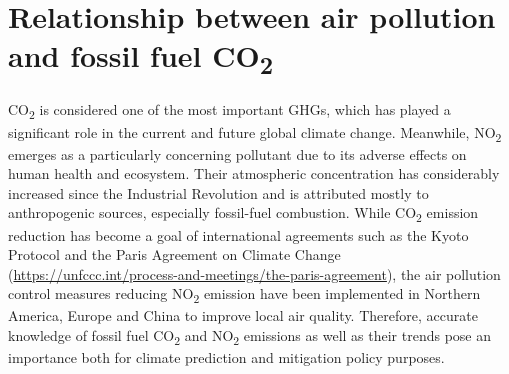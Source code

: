 \section{Relationship between air pollution and fossil fuel CO\textsubscript{2}}
CO\textsubscript{2} is considered one of the most important GHGs, which has played a significant role in the current and future global climate change. Meanwhile, NO\textsubscript{2} emerges as a particularly concerning pollutant due to its adverse effects on human health and ecosystem. Their atmospheric concentration has considerably increased since the Industrial Revolution and is attributed mostly to anthropogenic sources, especially fossil-fuel combustion. While CO\textsubscript{2} emission reduction has become a goal of international agreements such as the Kyoto Protocol \citep{protocol1997united} and the Paris Agreement on Climate Change (\url{https://unfccc.int/process-and-meetings/the-paris-agreement}), the air pollution control measures reducing NO\textsubscript{2} emission have been implemented in Northern America, Europe and China to improve local air quality. Therefore, accurate knowledge of fossil fuel CO\textsubscript{2} and NO\textsubscript{2} emissions as well as their trends pose an importance both for climate prediction and mitigation policy purposes. \par

